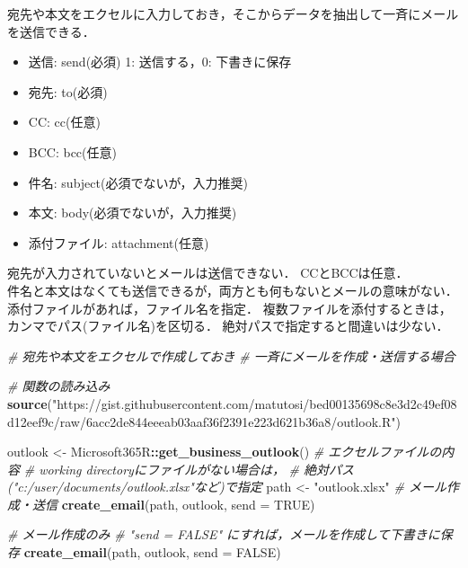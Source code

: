 \documentclass[
]{article}
\newenvironment{Shaded}{\begin{snugshade}}{\end{snugshade}}
\newcommand{\AttributeTok}[1]{\textcolor[rgb]{0.13,0.29,0.53}{#1}}
\newcommand{\CommentTok}[1]{\textcolor[rgb]{0.56,0.35,0.01}{\textit{#1}}}
\newcommand{\ConstantTok}[1]{\textcolor[rgb]{0.56,0.35,0.01}{#1}}
\newcommand{\FunctionTok}[1]{\textcolor[rgb]{0.13,0.29,0.53}{\textbf{#1}}}
\newcommand{\NormalTok}[1]{#1}
\newcommand{\OtherTok}[1]{\textcolor[rgb]{0.56,0.35,0.01}{#1}}
\newcommand{\SpecialCharTok}[1]{\textcolor[rgb]{0.81,0.36,0.00}{\textbf{#1}}}
\newcommand{\StringTok}[1]{\textcolor[rgb]{0.31,0.60,0.02}{#1}}
\providecommand{\tightlist}{%
  \setlength{\itemsep}{0pt}\setlength{\parskip}{0pt}}
\begin{document}
宛先や本文をエクセルに入力しておき，そこからデータを抽出して一斉にメールを送信できる．

\begin{itemize}
\tightlist
\item
  送信: send(必須) 1: 送信する，0: 下書きに保存
\item
  宛先: to(必須)\\
\item
  CC: cc(任意)\\
\item
  BCC: bcc(任意)\\
\item
  件名: subject(必須でないが，入力推奨)\\
\item
  本文: body(必須でないが，入力推奨)\\
\item
  添付ファイル: attachment(任意)
\end{itemize}

宛先が入力されていないとメールは送信できない．
CCとBCCは任意．\\
件名と本文はなくても送信できるが，両方とも何もないとメールの意味がない．\\
添付ファイルがあれば，ファイル名を指定．
複数ファイルを添付するときは，カンマでパス(ファイル名)を区切る．
絶対パスで指定すると間違いは少ない．

\begin{Shaded}
\begin{Highlighting}[]
  \CommentTok{\# 宛先や本文をエクセルで作成しておき}
  \CommentTok{\#   一斉にメールを作成・送信する場合}

  \CommentTok{\# 関数の読み込み}
\FunctionTok{source}\NormalTok{(}\StringTok{"https://gist.githubusercontent.com/matutosi/bed00135698c8e3d2c49ef08d12eef9c/raw/6acc2de844eeeab03aaf36f2391e223d621b36a8/outlook.R"}\NormalTok{)}

\NormalTok{outlook }\OtherTok{\textless{}{-}}\NormalTok{ Microsoft365R}\SpecialCharTok{::}\FunctionTok{get\_business\_outlook}\NormalTok{()}
  \CommentTok{\# エクセルファイルの内容}
  \CommentTok{\#   working directoryにファイルがない場合は，}
  \CommentTok{\#   絶対パス("c:/user/documents/outlook.xlsx"など)で指定}
\NormalTok{path }\OtherTok{\textless{}{-}} \StringTok{"outlook.xlsx"}
  \CommentTok{\# メール作成・送信}
\FunctionTok{create\_email}\NormalTok{(path, outlook, }\AttributeTok{send =} \ConstantTok{TRUE}\NormalTok{)}

  \CommentTok{\# メール作成のみ}
  \CommentTok{\#   "send = FALSE" にすれば，メールを作成して下書きに保存}
\FunctionTok{create\_email}\NormalTok{(path, outlook, }\AttributeTok{send =} \ConstantTok{FALSE}\NormalTok{)}
\end{Highlighting}
\end{Shaded}
\end{document}
